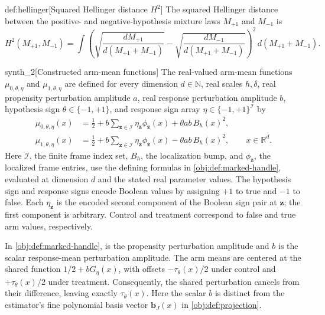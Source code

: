 \begin{definitionv}{def:hellinger}[Squared Hellinger distance \(H^2\)]
The squared Hellinger distance between the positive- and negative-hypothesis mixture laws \(M_{+1}\) and \(M_{-1}\) is
\[
H^2(M_{+1},M_{-1})
=
\int
\left(
\sqrt{\frac{dM_{+1}}{d(M_{+1}+M_{-1})}}
-
\sqrt{\frac{dM_{-1}}{d(M_{+1}+M_{-1})}}
\right)^2
\,d(M_{+1}+M_{-1}).
\]
\end{definitionv}

\begin{definitionv}{synth_2}[Constructed arm-mean functions]
The real-valued arm-mean functions \(\mu_{0,\theta,\eta}\) and \(\mu_{1,\theta,\eta}\) are defined for every dimension \(d\in\mathbb N\), real scales \(h,\delta\), real propensity perturbation amplitude \(a\), real response perturbation amplitude \(b\), hypothesis sign \(\theta\in\{-1,+1\}\), and response sign array \(\eta\in\{-1,+1\}^{\mathcal I}\) by
\[
\begin{aligned}
\mu_{0,\theta,\eta}(x)
&=\frac12+b\sum_{\mathbf z\in\mathcal I}
  \eta_{\mathbf z}\phi_{\mathbf z}(x)
  +\theta ab\,B_h(x)^2,\\
\mu_{1,\theta,\eta}(x)
&=\frac12+b\sum_{\mathbf z\in\mathcal I}
  \eta_{\mathbf z}\phi_{\mathbf z}(x)
  -\theta ab\,B_h(x)^2,
\qquad x\in\mathbb R^d.
\end{aligned}
\]
Here \(\mathcal I\), the finite frame index set, \(B_h\), the localization bump, and \(\phi_{\mathbf z}\), the localized frame entries, use the defining formulas in \cref{obj:def:marked-handle}, evaluated at dimension \(d\) and the stated real parameter values. The hypothesis sign and response signs encode Boolean values by assigning \(+1\) to true and \(-1\) to false. Each \(\eta_{\mathbf z}\) is the encoded second component of the Boolean sign pair at \(\mathbf z\); the first component is arbitrary. Control and treatment correspond to false and true arm values, respectively.
\end{definitionv}



In \cref{obj:def:marked-handle},  is the propensity perturbation amplitude and \(b\) is the scalar response-mean perturbation amplitude. The arm means are centered at the shared function \(1/2+bG_\eta(x)\), with offsets \(-\tau_\theta(x)/2\) under control and \(+\tau_\theta(x)/2\) under treatment. Consequently, the shared perturbation cancels from their difference, leaving exactly \(\tau_\theta(x)\). Here the scalar \(b\) is distinct from the estimator's fine polynomial basis vector \(\mathbf b_J(x)\) in \cref{obj:def:projection}.

